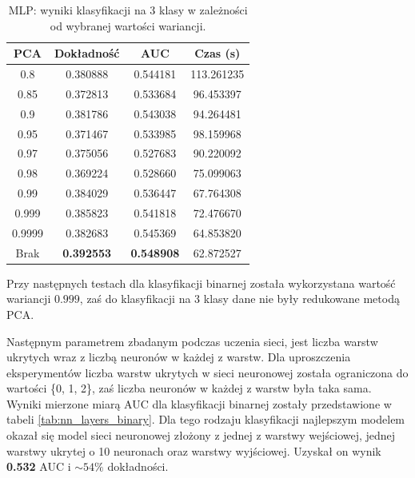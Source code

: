 \documentclass[a4paper, twoside, 11pt, openright]{article}
\begin{document}
\begin{table}[H]
    \centering
    \begin{tabular}{|c|c|c|c|}
    \hline
        \textbf{PCA} & \textbf{Dokładność} &  \textbf{AUC} &  \textbf{Czas (s)} \\ \hline
0.8                &  0.380888 &  0.544181 &  113.261235 \\ \hline
0.85               &  0.372813 &  0.533684 &   96.453397 \\ \hline
0.9                &  0.381786 &  0.543038 &   94.264481 \\ \hline
0.95               &  0.371467 &  0.533985 &   98.159968 \\ \hline
0.97               &  0.375056 &  0.527683 &   90.220092 \\ \hline
0.98               &  0.369224 &  0.528660 &   75.099063 \\ \hline
0.99               &  0.384029 &  0.536447 &   67.764308 \\ \hline
0.999              &  0.385823 &  0.541818 &   72.476670 \\ \hline
0.9999             &  0.382683 &  0.545369 &   64.853820 \\ \hline
Brak                &  \textbf{0.392553} &  \textbf{0.548908} &   62.872527 \\ \hline
    \end{tabular}
    \caption{MLP: wyniki klasyfikacji na 3 klasy w zależności od wybranej wartości wariancji.}
    \label{tab:nn_pca_discrete}
\end{table}

Przy następnych testach dla klasyfikacji binarnej została wykorzystana wartość wariancji $0.999$, zaś do klasyfikacji na 3 klasy dane nie były redukowane metodą PCA.

\bigskip

Następnym parametrem zbadanym podczas uczenia sieci, jest liczba warstw ukrytych wraz z liczbą neuronów w każdej z warstw. Dla uproszczenia eksperymentów liczba warstw ukrytych w sieci neuronowej została ograniczona do wartości \{0, 1, 2\}, zaś liczba neuronów w każdej z warstw była taka sama. Wyniki mierzone miarą AUC dla klasyfikacji binarnej zostały przedstawione w tabeli \ref{tab:nn_layers_binary}. Dla tego rodzaju klasyfikacji najlepszym modelem okazał się model sieci neuronowej złożony z jednej z warstwy wejściowej, jednej warstwy ukrytej o 10 neuronach oraz warstwy wyjściowej. Uzyskał on wynik \textbf{0.532} AUC i $\sim 54\%$ dokładności.
\end{document}
